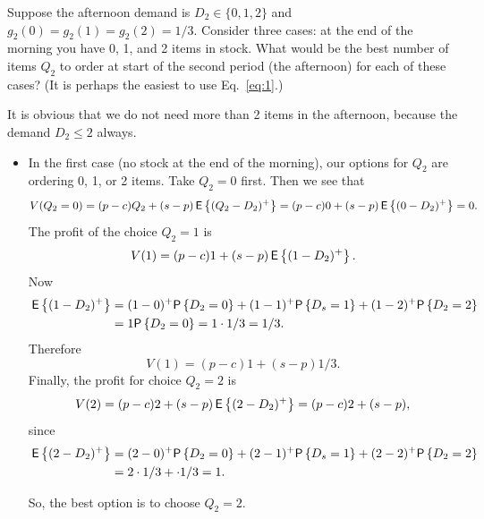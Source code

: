 \begin{question}
Suppose the afternoon demand is $D_2\in \{0,1,2\}$ and $g_2(0)=g_2(1)=g_2(2)=1/3$.  Consider  three cases: at the end of the morning you have  0, 1, and 2 items in stock. What would be the best number of items $Q_2$ to order at start of the second period (the afternoon) for each of these cases? (It is perhaps the easiest to use Eq.~\eqref{eq:1}.)

\begin{solution}
	It is obvious that we do not need more than 2 items in the afternoon, because the demand $D_2\leq 2$ always.
	
	\begin{itemize}
	
	\item In the first case (no stock at the end of the morning), our options for $Q_2$ are ordering 0, 1, or 2 items. Take $Q_2=0$ first. Then we see that 
    \begin{equation*}
V(Q_2=0) = (p -c)Q_2  + (s-p)\,\mathsf{E}\left\{(Q_2-D_2)^+\right\} = (p -c) 0   + (s-p)\,\mathsf{E}\left\{(0-D_2)^+\right\} = 0.
\end{equation*}
The profit of the choice $Q_2=1$ is 
    \begin{equation*}
V(1) = (p -c)1  + (s-p)\,\mathsf{E}\left\{(1-D_2)^+\right\}. 
\end{equation*}
Now
\begin{equation*}
  \begin{split}
\E{(1-D_2)^+}
&=(1-0)^+\P{D_2=0} + (1-1)^+\P{D_s=1} + (1-2)^+ \P{D_2=2} \\
&= 1 \P{D_2=0} = 1\cdot 1/3 = 1/3.
  \end{split}
\end{equation*}
Therefore
    \begin{equation*}
V(1) = (p -c)1  + (s-p) 1/3.
  \end{equation*}
Finally, the profit for choice $Q_2=2$ is 
    \begin{equation*}
V(2) = (p -c)2  + (s-p)\,\mathsf{E}\left\{(2-D_2)^+\right\} = (p-c)2 + (s-p),
\end{equation*}
since
\begin{equation*}
  \begin{split}
\E{(2-D_2)^+}
&=(2-0)^+\P{D_2=0} + (2-1)^+\P{D_s=1} + (2-2)^+ \P{D_2=2} \\
&= 2\cdot 1/3 + \cdot 1/3 = 1.
  \end{split}
\end{equation*}

So, the best option is to choose $Q_2=2$. 


\end{itemize}
\end{solution}
\end{question}
